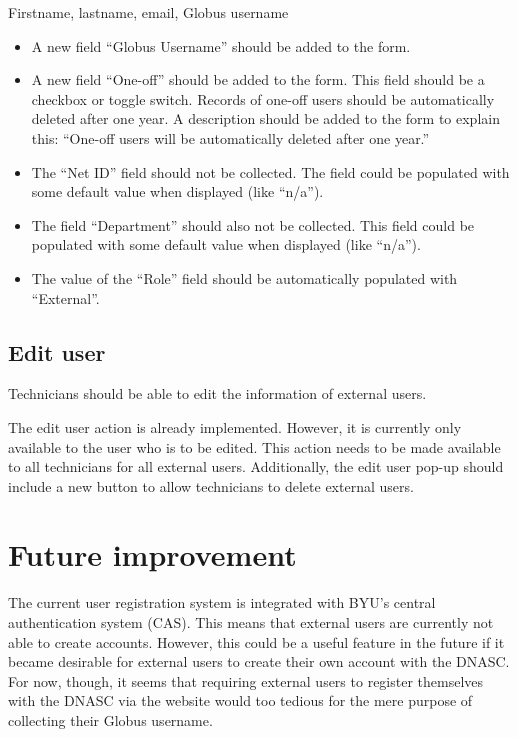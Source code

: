 Firstname, lastname, email, Globus username
\begin{itemize}\itemsep1pt
    \item A new field ``Globus Username'' should be added to the form.
    \item A new field ``One-off'' should be added to the form. This field should be
    a checkbox or toggle switch. Records of one-off users should be automatically 
    deleted after one year. A description should be added to the form to explain this:
    ``One-off users will be automatically deleted after one year.''
    \item The ``Net ID'' field should not be collected. The field could be populated 
    with some default value when displayed (like ``n/a'').
    \item The field ``Department'' should also not be collected. This field could be
    populated with some default value when displayed (like ``n/a'').
    \item The value of the ``Role'' field should be automatically populated with 
    ``External''.
\end{itemize}

\subsection{Edit user}

Technicians should be able to edit the information of external users.

The edit user action is already implemented. However, it is currently only available
to the user who is to be edited. This action needs to be made available to all 
technicians for all external users. Additionally, the edit user pop-up should include 
a new button to allow technicians to delete external users.

\section{Future improvement}
The current user registration system is integrated with BYU's central 
authentication system (CAS). This means that external users are currently not 
able to create accounts. However, this could be a useful feature in the future 
if it became desirable for external users to create their own account with the DNASC.
For now, though, it seems that requiring external users to register themselves with 
the DNASC via the website would too tedious for the mere purpose of collecting their
Globus username.

